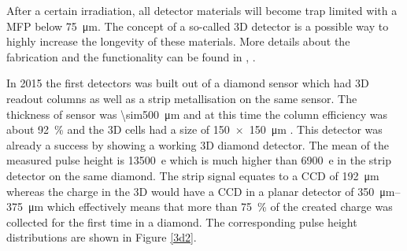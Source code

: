 After a certain irradiation, all detector materials will become trap limited with a \ac{MFP} below \SI{75}{\micro\meter}. The concept of a so-called 3D detector is a possible way to highly increase the longevity of these materials. More details about the fabrication and the functionality can be found in \cite{3D}, \cite{parker}.\par
In 2015 the first detectors was built out of a \pcvd diamond sensor which had 3D readout 
columns as well as a strip metallisation on the same sensor. The thickness of sensor was \SI{\sim500}{\micro\meter} and at this time the column efficiency was about \SI{92}{\%} and the 3D cells had a size of \SI{150x150}{\micro\meter} \cite{felix}. This detector was already a success by showing a working 3D diamond detector. 
The mean of the measured pulse height is \SI{13500}{e} which is much higher than \SI{6900}{e} in the strip detector on the same diamond. The strip signal equates to a \ac{CCD} of \SI{192}{\micro\meter} whereas the charge in the 3D would have a \ac{CCD} in a planar detector of \SIrange{350}{375}{\micro\meter} which effectively means that more than \SI{75}{\%} of the created charge was collected for the first time in a \pcvd diamond. The corresponding pulse height distributions are shown in Figure \vref{3d2}.\par
